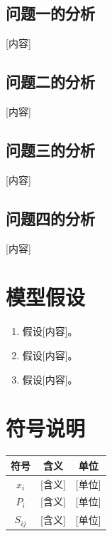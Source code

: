 \documentclass[a4paper,12pt]{article}
\begin{document}
	\subsection{问题一的分析}
	[内容]
	
	\subsection{问题二的分析}
	[内容]
	
	\subsection{问题三的分析}
	[内容]
	
	\subsection{问题四的分析}
	[内容]
	
	\newpage
	
	\section{模型假设}
	
	\begin{enumerate}
		\item 假设[内容]。
		\item 假设[内容]。
		\item 假设[内容]。
	\end{enumerate}
	
	\newpage
	
	\section{符号说明}
	
	\begin{table}[H]
		\centering
		\begin{tabular}{c|c|c}
			\hline
			\textbf{符号} & \textbf{含义} & \textbf{单位} \\
			\hline
			$x_i$ & [含义] & [单位] \\
			$P_i$ & [含义] & [单位] \\
			$S_{ij}$ & [含义] & [单位] \\
			\hline
		\end{tabular}
	\end{table}
	
	\newpage
	
\end{document}
